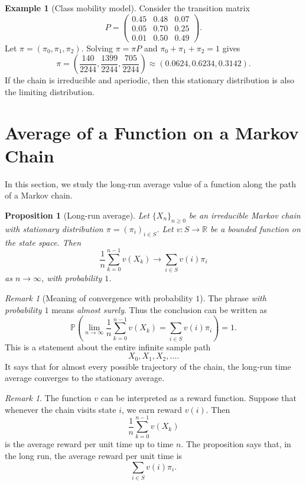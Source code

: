 \documentclass[11pt]{article}
\theoremstyle{plain}
\newtheorem{proposition}[theorem]{Proposition}
\theoremstyle{definition}
\newtheorem{example}[theorem]{Example}
\theoremstyle{remark}
\newtheorem{remark}[theorem]{Remark}
\begin{document}
	\begin{example}[Class mobility model]
		Consider the transition matrix
		\[
		P=
		\begin{pmatrix}
			0.45 & 0.48 & 0.07\\
			0.05 & 0.70 & 0.25\\
			0.01 & 0.50 & 0.49
		\end{pmatrix}.
		\]
		Let \(\pi=(\pi_0,\pi_1,\pi_2)\). Solving \(\pi=\pi P\) and \(\pi_0+\pi_1+\pi_2=1\) gives
		\[
		\pi=
		\left(
		\frac{140}{2244},
		\frac{1399}{2244},
		\frac{705}{2244}
		\right)
		\approx
		(0.0624,0.6234,0.3142).
		\]
		If the chain is irreducible and aperiodic, then this stationary distribution is also the limiting distribution.
	\end{example}
	
	
	
	\section{Average of a Function on a Markov Chain}
	
	In this section, we study the long-run average value of a function along the path of a Markov chain.
	\begin{proposition}[Long-run average]
		Let \(\{X_n\}_{n\ge 0}\) be an irreducible Markov chain with stationary distribution \(\pi=(\pi_i)_{i\in S}\). Let \(v:S\to\mathbb{R}\) be a bounded function on the state space. Then
		\[
		\frac{1}{n}\sum_{k=0}^{n-1}v(X_k)
		\longrightarrow
		\sum_{i\in S}v(i)\pi_i
		\]
		as \(n\to\infty\), with probability \(1\).
	\end{proposition}
	

	
	\begin{remark}[Meaning of convergence with probability \(1\)]
		The phrase \emph{with probability \(1\)} means \emph{almost surely}. Thus the conclusion can be written as
		\[
		\mathbb{P}\left(
		\lim_{n\to\infty}
		\frac{1}{n}\sum_{k=0}^{n-1}v(X_k)
		=
		\sum_{i\in S}v(i)\pi_i
		\right)
		=
		1.
		\]
		This is a statement about the entire infinite sample path
		\[
		X_0,X_1,X_2,\dots.
		\]
		It says that for almost every possible trajectory of the chain, the long-run time average converges to the stationary average.
	\end{remark}
	

	
	
	\begin{remark}
		The function \(v\) can be interpreted as a reward function. Suppose that whenever the chain visits state \(i\), we earn reward \(v(i)\). Then
		\[
		\frac{1}{n}\sum_{k=0}^{n-1}v(X_k)
		\]
		is the average reward per unit time up to time \(n\). The proposition says that, in the long run, the average reward per unit time is
		\[
		\sum_{i\in S}v(i)\pi_i.
		\]
	\end{remark}
	
\end{document}
